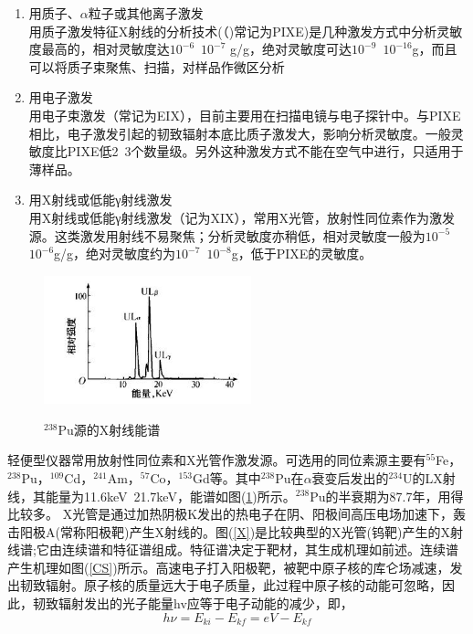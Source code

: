 \documentclass[a4paper]{article}
\begin{document}
\begin{enumerate}
\item 用质子、$\alpha$粒子或其他离子激发\\
用质子激发特征X射线的分析技术(（)常记为PIXE)是几种激发方式中分析灵敏度最高的，相对灵敏度达$10^{-6}$~$10^{-7}$ g/g，绝对灵敏度可达$10^{-9}$~$10^{-16}$g，而且可以将质子束聚焦、扫描，对样品作微区分析
\item 用电子激发\\
用电子束激发（常记为EIX），目前主要用在扫描电镜与电子探针中。与PIXE相比，电子激发引起的韧致辐射本底比质子激发大，影响分析灵敏度。一般灵敏度比PIXE低2~3个数量级。另外这种激发方式不能在空气中进行，只适用于薄样品。
\item 用X射线或低能γ射线激发\\
用X射线或低能γ射线激发（记为XIX），常用X光管，放射性同位素作为激发源。这类激发用射线不易聚焦；分析灵敏度亦稍低，相对灵敏度一般为$10^{-5}$~$10^{-6}$g/g，绝对灵敏度约为$10^{-7}$~$10^{-8}$g，低于PIXE的灵敏度。
\end{enumerate}
\begin{figure}[!h]
\centering
\includegraphics[width=6cm]{fig/Pu238.jpg}\\
\caption{$^{238}$Pu源的X射线能谱}\label{Pu238}
\end{figure}
轻便型仪器常用放射性同位素和X光管作激发源。可选用的同位素源主要有$^{55}$Fe，$^{238}$Pu，$^{109}$Cd，$^{241}$Am，$^{57}$Co，$^{153}$Gd等。其中$^{238}$Pu在$\alpha$衰变后发出的$^{234}$U的LX射线，其能量为11.6keV~21.7keV，能谱如图(\ref{Pu238})所示。$^{238}$Pu的半衰期为87.7年，用得比较多。
X光管是通过加热阴极K发出的热电子在阴、阳极间高压电场加速下，轰击阳极A(常称阳极靶)产生X射线的。图(\ref{X})是比较典型的X光管(钨靶)产生的X射线谱;它由连续谱和特征谱组成。特征谱决定于靶材，其生成机理如前述。连续谱产生机理如图(\ref{CS})所示。高速电子打入阳极靶，被靶中原子核的库仑场减速，发出韧致辐射。原子核的质量远大于电子质量，此过程中原子核的动能可忽略，因此，韧致辐射发出的光子能量hv应等于电子动能的减少，即，
\begin{equation}
h\nu = E_{ki} - E_{kf} = eV - E_{kf}
\end{equation}
\end{document}
